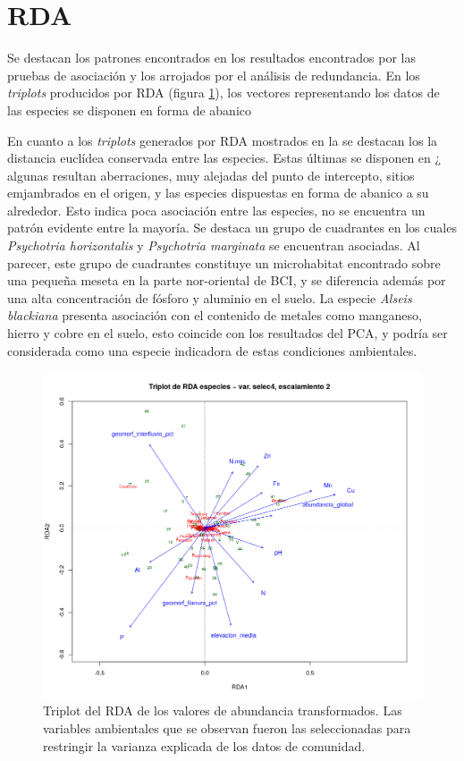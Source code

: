 \documentclass[11pt,]{article}
\begin{document}
\section{RDA}\label{rda}

Se destacan los patrones encontrados en los resultados encontrados por
las pruebas de asociación y los arrojados por el análisis de
redundancia. En los \emph{triplots} producidos por RDA (figura
\ref{fig:rda_triplot_var_selec_4_escal2}), los vectores representando
los datos de las especies se disponen en forma de abanico

En cuanto a los \emph{triplots} generados por RDA mostrados en la se
destacan los la distancia euclídea conservada entre las especies. Estas
últimas se disponen en ¿ algunas resultan aberraciones, muy alejadas del
punto de intercepto, sitios emjambrados en el origen, y las especies
dispuestas en forma de abanico a su alrededor. Esto indica poca
asociación entre las especies, no se encuentra un patrón evidente entre
la mayoría. Se destaca un grupo de cuadrantes en los cuales
\emph{Psychotria horizontalis} y \emph{Psychotria marginata} se
encuentran asociadas. Al parecer, este grupo de cuadrantes constituye un
microhabitat encontrado sobre una pequeña meseta en la parte
nor-oriental de BCI, y se diferencia además por una alta concentración
de fósforo y aluminio en el suelo. La especie \emph{Alseis blackiana}
presenta asociación con el contenido de metales como manganeso, hierro y
cobre en el suelo, esto coincide con los resultados del PCA, y podría
ser considerada como una especie indicadora de estas condiciones
ambientales.

\begin{figure}
\centering
\includegraphics{rda_triplot_var_selec_4_escal2.png}
\caption{Triplot del RDA de los valores de abundancia transformados. Las
variables ambientales que se observan fueron las seleccionadas para
restringir la varianza explicada de los datos de comunidad.
\label{fig:rda_triplot_var_selec_4_escal2}}
\end{figure}
\end{document}

